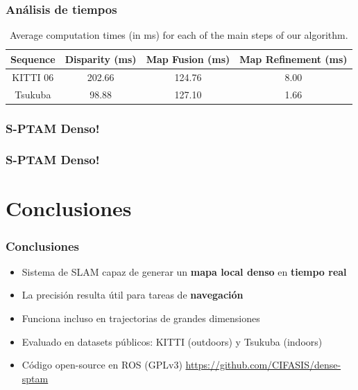 \documentclass[compress]{beamer}
\begin{document}
\begin{frame}
	\frametitle{Análisis de tiempos}
	\begin{table}[!htb]
		\centering
		\small
		\begin{tabular}{cccc}
			\toprule
			Sequence & Disparity (ms) & Map Fusion (ms) & Map Refinement (ms) \\
			\midrule
			KITTI 06 & 202.66 & 124.76 & 8.00 \\
			Tsukuba & 98.88 & 127.10 & 1.66 \\
			\bottomrule
		\end{tabular}
		\caption{Average computation times (in ms) for each of the main steps of our algorithm.} \label{table:table_times}
	\end{table}
\end{frame}

\begin{frame}
	\frametitle{S-PTAM Denso!}
	\centering
	
\end{frame}

\begin{frame}
	\frametitle{S-PTAM Denso!}
	\centering
	
\end{frame}

\section{Conclusiones}

\begin{frame}
	\frametitle{Conclusiones}
	\begin{itemize}
		\item Sistema de SLAM capaz de generar un \textbf{mapa local denso} en \textbf{tiempo real}
        \item La precisión resulta útil para tareas de \textbf{navegación}
        \item Funciona incluso en trajectorias de grandes dimensiones
        \item Evaluado en datasets públicos: KITTI (outdoors) y Tsukuba (indoors)
	    \item Código open-source en ROS (GPLv3)
	    \url{https://github.com/CIFASIS/dense-sptam}
	\end{itemize}
\end{frame}
\end{document}
